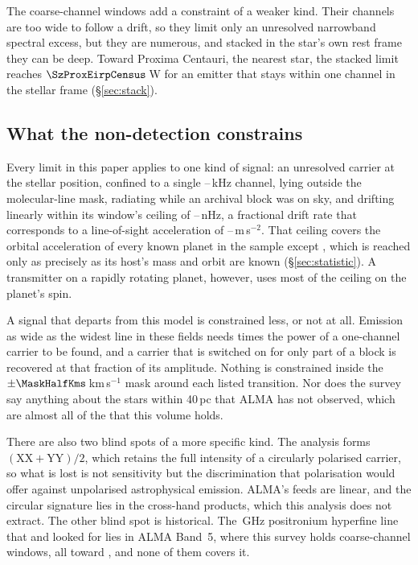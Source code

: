 The \NCoarse{} coarse-channel windows add a constraint of a weaker kind.
Their channels are too wide to follow a drift, so they limit only an
unresolved narrowband spectral excess, but they are numerous, and stacked in
the star's own rest frame they can be deep. Toward Proxima Centauri, the
nearest star, the stacked limit reaches $\SzProxEirpCensus$\,W for an
emitter that stays within one channel in the stellar frame
(\S\ref{sec:stack}).

\subsection{What the non-detection constrains}
\label{sec:excludes}

Every limit in this paper applies to one kind of signal: an unresolved
carrier at the stellar position, confined to a single
\ChanLoA--\ChanHiA\,kHz channel, lying outside the molecular-line mask,
radiating while an archival block was on sky, and drifting linearly within
its window's ceiling of \DriftCeilLo--\DriftCeilHi\,nHz, a fractional drift
rate that corresponds to a line-of-sight acceleration of
\AccelCeilMed--\AccelCeilMax\,m\,s$^{-2}$. That ceiling covers
the orbital acceleration of every known planet in the sample except
\AccelWorstName, which is reached only as precisely as its host's mass and
orbit are known (\S\ref{sec:statistic}). A transmitter on a rapidly rotating
planet, however, uses most of the ceiling on the planet's spin.

A signal that departs from this model is constrained less, or not at all.
Emission as wide as the widest line in these fields needs \ScNBroadRatio{}
times the power of a one-channel carrier to be found, and a carrier that is
switched on for only part of a block is recovered at that fraction of its
amplitude. Nothing is constrained inside the $\pm\MaskHalfKms$\,km\,s$^{-1}$
mask around each listed transition. Nor does the survey say anything about
the stars within 40\,pc that ALMA has not observed, which are almost all of
the \NGaiaCensus{} that this volume holds.

There are also two blind spots of a more specific kind. The analysis forms
$(\mathrm{XX}+\mathrm{YY})/2$, which retains the full intensity of a
circularly polarised carrier, so what is lost is not sensitivity but the
discrimination that polarisation would offer against unpolarised
astrophysical emission. ALMA's feeds are linear, and the circular signature
lies in the cross-hand products, which this analysis does not extract. The
other blind spot is historical. The \SbPriorFreqGHz\,GHz positronium
hyperfine line that \citet{Steffes1994} and \citet{Mauersberger1996} looked
for lies in ALMA Band~5, where this survey holds \LnBFiveWin{} coarse-channel
windows, all toward \LnBFiveStars, and none of them covers it.

